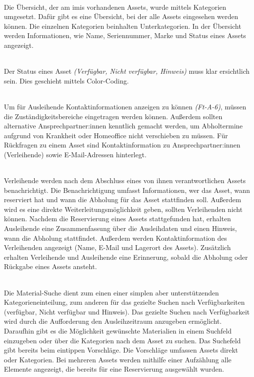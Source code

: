     {\sffamily\color{maincolor}{Ft-B-2 | Übersicht über ausleihbare Assets }}\\
Die Übersicht, der am \ac{imis} vorhandenen Assets, wurde mittels Kategorien umgesetzt. Dafür gibt es
eine Übersicht, bei der alle Assets eingesehen werden können. Die einzelnen Kategorien beinhalten
Unterkategorien. In der Übersicht werden Informationen, wie Name, Seriennummer, Marke und Status
eines Assets angezeigt.

    {\sffamily\color{maincolor}{Ft-B-3 |  Verfügbarkeit von Assets }}\\
Der Status eines Asset \textit{(Verfügbar, Nicht verfügbar, Hinweis)} muss klar ersichtlich sein.
Dies geschieht mittels Color-Coding.  


{\sffamily\color{maincolor}{Ft-B-4 | Zuständigkeitsbereich }}\\
Um für Ausleihende Kontaktinformationen anzeigen zu können \textit{(Ft-A-6)}, müssen die
Zuständigkeitsbereiche eingetragen werden können. Außerdem sollten alternative Ansprechpartner:innen
kenntlich gemacht werden, um Abholtermine aufgrund von Krankheit oder Homeoffice nicht verschieben
zu müssen. Für Rückfragen zu einem Asset sind Kontaktinformation zu Ansprechpartner:innen
(Verleihende) sowie E-Mail-Adressen hinterlegt.

{\sffamily\color{maincolor}{Ft-B-5 | Benachrichtigungen \& Erinnerungen }}\\
Verleihende werden nach dem Abschluss eines von ihnen verantwortlichen Assets benachrichtigt. Die
Benachrichtigung umfasst Informationen, wer das Asset, wann reserviert hat und wann die Abholung für
das Asset stattfinden soll. Außerdem wird es eine direkte Weiterleitungsmöglichkeit geben, sollten
Verleihenden nicht können. Nachdem die Reservierung eines Assets stattgefunden hat, erhalten
Ausleihende eine Zusammenfassung über die Ausleihdaten und einen Hinweis, wann die Abholung
stattfindet. Außerdem werden Kontaktinformation des Verleihenden angezeigt (Name, E-Mail und
Lagerort des Assets). Zusätzlich erhalten Verleihende und Ausleihende eine Erinnerung, sobald die
Abholung oder Rückgabe eines Assets ansteht.


    {\sffamily\color{maincolor}{Ft-B-6 | Material-Suche }}\\
Die Material-Suche dient zum einen einer simplen aber unterstützenden Kategorieneinteilung, zum
anderen für das gezielte Suchen nach Verfügbarkeiten (verfügbar, Nicht verfügbar und Hinweis). Das
gezielte Suchen nach Verfügbarkeit wird durch die Aufforderung den Ausleihzeitraum anzugeben
ermöglicht. Daraufhin gibt es die Möglichkeit gewünschte Materialien in einem Suchfeld einzugeben
oder über die Kategorien nach dem Asset zu suchen. Das Suchefeld gibt bereits beim eintippen
Vorschläge. Die Vorschläge umfassen Assets direkt oder Kategorien. Bei mehreren Assets werden
mithilfe einer Aufzählung alle Elemente angezeigt, die bereits für eine Reservierung ausgewählt
wurden.


